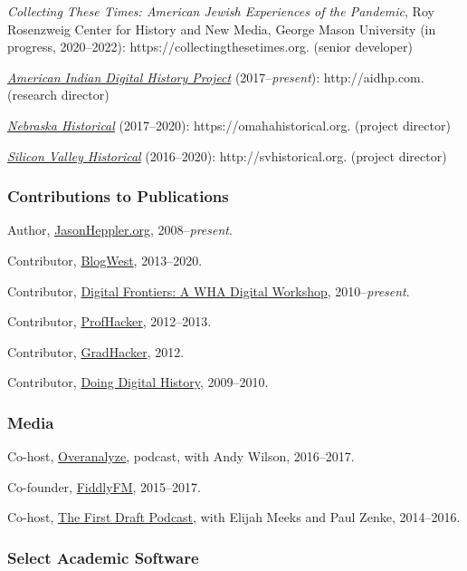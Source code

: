 \emph{Collecting These Times: American Jewish Experiences of the
Pandemic}, Roy Rosenzweig Center for History and New Media, George Mason
University (in progress, 2020--2022): https://collectingthesetimes.org.
(senior developer)

\emph{\href{http://aidhp.com}{American Indian Digital History Project}}
(2017--\emph{present}): http://aidhp.com. (research director)

\emph{\href{https://omahahistorical.org}{Nebraska Historical}}
(2017--2020): https://omahahistorical.org. (project director)

\emph{\href{http://svhistorical.org}{Silicon Valley Historical}}
(2016--2020): http://svhistorical.org. (project director)

\subsubsection{Contributions to
Publications}\label{contributions-to-publications}

Author, \href{http://jasonheppler.org}{JasonHeppler.org},
2008--\emph{present}.

Contributor, \href{http://blogwest.org/}{BlogWest}, 2013--2020.

Contributor, \href{http://whadigitalfrontiers.com/}{Digital Frontiers: A
WHA Digital Workshop}, 2010--\emph{present}.

Contributor, \href{http://chronicle.com/blogs/profhacker/}{ProfHacker},
2012--2013.

Contributor,
\href{https://www.insidehighered.com/blogs/gradhacker}{GradHacker},
2012.

Contributor, \href{http://digitalhistory.unl.edu/}{Doing Digital
History}, 2009--2010.

\subsubsection{Media}\label{media}

Co-host, \href{http://overanalyze.fireside.fm}{Overanalyze}, podcast,
with Andy Wilson, 2016--2017.

Co-founder, \href{http://fiddly.fm}{FiddlyFM}, 2015--2017.

Co-host, \href{http://www.fiddly.fm/firstdraft/}{The First Draft
Podcast}, with Elijah Meeks and Paul Zenke, 2014--2016.

\subsubsection{Select Academic Software}\label{select-academic-software}

